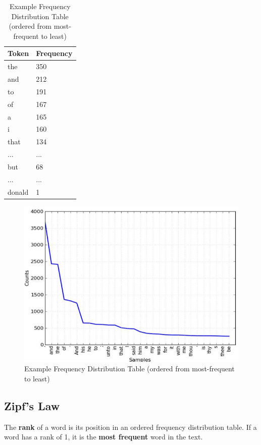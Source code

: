 \documentclass{article}
\begin{document}
\begin{table}
	\centering
	\begin{tabular}{|l|l|}
		\hline
		\textbf{Token} & \textbf{Frequency} \\
		\hline
		the & 350 \\
		and & 212 \\
		to & 191 \\
		of & 167 \\
		a & 165 \\
		i & 160 \\
		that & 134 \\
		... & ...\\
		but & 68 \\
		... & ...\\
		donald & 1 \\
		\hline
	\end{tabular}
	\caption{Example Frequency Distribution Table (ordered from most-frequent to least)}
	\label{tab:freqdist}
\end{table}

\begin{figure}
	\centering
	\includegraphics[scale=0.4]{figures/frequency-distribution.png}
	\caption{Example Frequency Distribution Table (ordered from most-frequent to least)}
	\label{fig:freqdist}
\end{figure}


\subsection{Zipf's Law}

The \textbf{rank} of a word is its position in an ordered frequency distribution table. If a word has a rank of 1, it is the \textbf{most frequent} word in the text.
\end{document}
